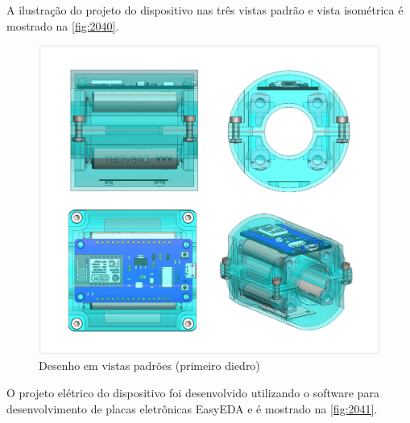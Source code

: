A ilustração do projeto do dispositivo nas três vistas padrão e vista isométrica é mostrado na \autoref{fig:2040}.

\begin{figure}[H]
	\caption{\label{fig:2040} Desenho em vistas padrões (primeiro diedro)}
	\begin{center}
		\includegraphics[width=\textwidth]{pictures/2040.png}
	\end{center}
\end{figure}

O projeto elétrico do dispositivo foi desenvolvido utilizando o software para desenvolvimento de placas eletrônicas EasyEDA e é mostrado na \autoref{fig:2041}.

